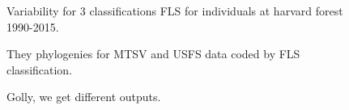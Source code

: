 \documentclass{article}
\begin{document}
\begin{figure}[ht!]
    \captionsetup{justification=centering}
    \begin{minipage}{\linewidth}

    \end{minipage}
    \caption{Variability for 3 classifications FLS for individuals at harvard forest 1990-2015.}
\end{figure}

\begin{figure}[ht!]
    \captionsetup{justification=centering}
    \begin{minipage}{.6\linewidth}
    \end{minipage}
    \caption{They phylogenies for MTSV and USFS data coded by FLS classification.}
\end{figure}




\begin{figure}[!tbp]
  \centering
\caption{Golly, we get different outputs.}
\end{figure}
\end{document}
